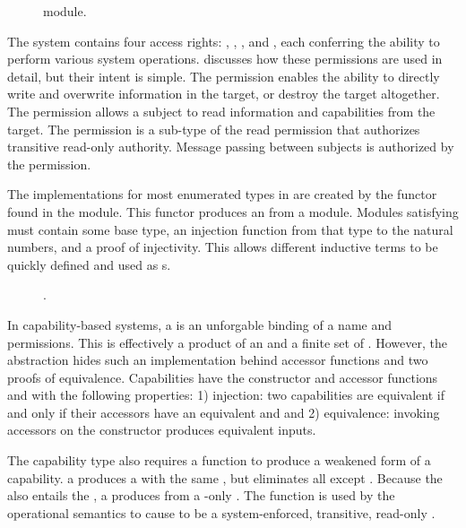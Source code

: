 \begin{figure}
  \COQDOCAccessRights{}
  \caption{\COQAccessRights{} module. \label{fig:embed:accessRights}}
\end{figure}

The system contains four access rights: \COQrd{}, \COQwr{}, \COQwk{}, and \COQtx{}, each conferring the ability to perform various system operations.
 discusses how these permissions are used in detail, but their intent is simple.
The \COQwr{} permission enables the ability to directly write and overwrite information in the target, or destroy the target altogether.
The \COQrd{} permission allows a subject to read information and capabilities from the target.
The \COQwk{} permission is a sub-type of the read permission that authorizes transitive read-only authority.
Message passing between subjects is authorized by the \COQtx{} permission.

The implementations for most enumerated types in \TMmodelName{} are created by the \COQPOTtoOT{} functor found in the \COQProjectedOrderedType{} module.
This functor produces an \COQOrderedType{} from a \COQProjectedToNat{} module.
Modules satisfying \COQProjectedToNat{} must contain some base type, an injection function from that type to the natural numbers, and a proof of injectivity.
This allows different inductive terms to be quickly defined and used as \COQOrderedType{}s.

\begin{figure}
  \COQDOCCapabilities{}
  \caption{\xmakefirstuc{\TMcaps}. \label{fig:embed:caps}}
\end{figure}

In capability-based systems, a \term{\TMcap{}} is an unforgable binding of a name and permissions.
This is effectively a product of an \TMref{} and a finite set of \TMaccessRights{}.
However, the \TMcap{} abstraction hides such an implementation behind accessor functions and two proofs of equivalence.
Capabilities have the constructor \COQmkCap{} and accessor functions \COQcapTarget{} and \COQcapRights{} with the following properties:
1) injection: two capabilities are equivalent if and only if their accessors have an equivalent \TMcapTarget{} and \TMcapRight{} and
2) equivalence: invoking accessors on the constructor produces equivalent inputs.

The capability type also requires a \NMweaken{} function to produce a weakened form of a capability.
\xmakefirstuc{\TMweakening} a \TMcap{} produces a \TMcap{} with the same \TMcapTarget{}, but eliminates all \TMaccessRights{} except \NMwk{}.
Because the \NMrd{} also entails the \NMwk{} \TMaccessRight{}, a \TMweakened{} \TMcap{} produces \NMwk{} from a \NMrd{}-only \TMcap{}.
The \NMweaken{} function is used by the operational semantics to cause \COQwk{} to be a system-enforced, transitive, read-only \TMaccessRight{}.

